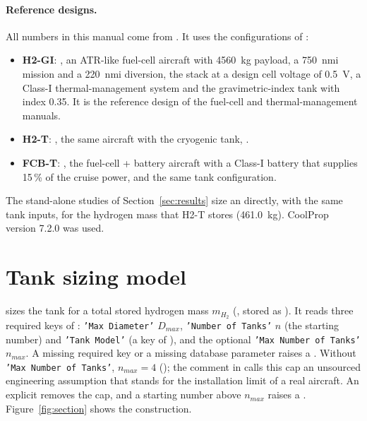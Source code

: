 \documentclass[a4paper,11pt]{article}
\begin{document}
\paragraph{Reference designs.} All numbers in this manual come from
. It uses the configurations of
:
\begin{itemize}
\item \textbf{H2-GI}: , an ATR-like fuel-cell aircraft with
  \SI{4560}{kg} payload, a \SI{750}{nmi} mission and a \SI{220}{nmi} diversion, the
   stack at a design cell voltage of \SI{0.5}{V}, a Class-I
  thermal-management system and the gravimetric-index tank with index 0.35. It is the reference
  design of the fuel-cell and thermal-management manuals.
\item \textbf{H2-T}: , the same aircraft with the cryogenic
  tank, .
\item \textbf{FCB-T}: , the fuel-cell + battery
  aircraft with a Class-I battery that supplies 15\,\% of the cruise power, and the same tank
  configuration.
\end{itemize}
The stand-alone studies of Section~\ref{sec:results} size an  directly, with
the same tank inputs, for the hydrogen mass that H2-T stores (\SI{461.0}{kg}). CoolProp
version 7.2.0 was used.

\section{Tank sizing model}\label{sec:sizing}

 sizes the tank for a
total stored hydrogen mass $m_{H_2}$ (, stored as ).
It reads three required keys of : \texttt{'Max Diameter'} $D_{max}$,
\texttt{'Number of Tanks'} $n$ (the starting number) and \texttt{'Tank Model'} (a key of
), and the optional \texttt{'Max Number of Tanks'} $n_{max}$. A missing
required key or a missing database parameter raises a . Without
\texttt{'Max Number of Tanks'}, $n_{max} = 4$ (); the
comment in  calls this cap an unsourced engineering assumption that stands for
the installation limit of a real aircraft. An explicit  removes the cap, and a
starting number above $n_{max}$ raises a . Figure~\ref{fig:section}
shows the construction.
\end{document}
